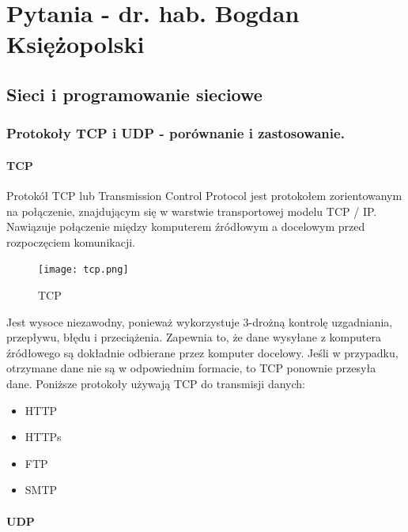 \documentclass[a4paper,12pt,oneside]{book}
\begin{document}
	

	\tableofcontents
	\newpage
	
	\chapter{Pytania - dr. hab. Bogdan Księżopolski}
	
		\section{Sieci i programowanie sieciowe}
			\subsection{Protokoły TCP i UDP - porównanie i zastosowanie.}
			
				\subsubsection*{TCP}
				
				Protokół TCP lub Transmission Control Protocol jest protokołem zorientowanym na połączenie, znajdującym się w warstwie transportowej modelu TCP / IP. Nawiązuje połączenie między komputerem źródłowym a docelowym przed rozpoczęciem komunikacji.
				
				\begin{figure}[h!]
					\centering\texttt{[image: tcp.png]}
					\caption{TCP}
				\end{figure}
				
				Jest wysoce niezawodny, ponieważ wykorzystuje 3-drożną kontrolę uzgadniania, przepływu, błędu i przeciążenia. Zapewnia to, że dane wysyłane z komputera źródłowego są dokładnie odbierane przez komputer docelowy. Jeśli w przypadku, otrzymane dane nie są w odpowiednim formacie, to TCP ponownie przesyła dane.
				Poniższe protokoły używają TCP do transmisji danych:
				\begin{itemize}
					\item HTTP
					\item HTTPs
					\item FTP
					\item SMTP
				\end{itemize}
				
				\subsubsection*{UDP}
				
\end{document}
